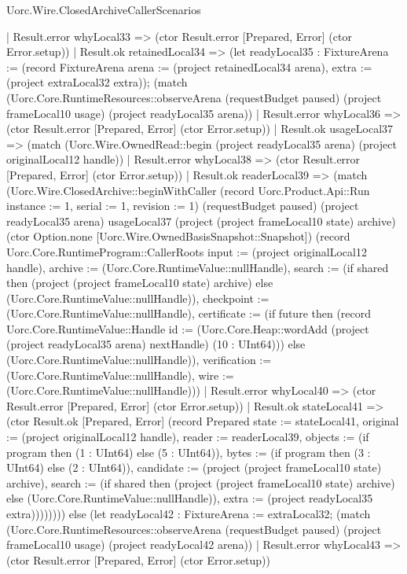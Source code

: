 \begin{lexlean}{Uorc.Wire.ClosedArchiveCallerScenarios}
\begin{semanticmodule}
{          | Result.error whyLocal33 => (ctor Result.error [Prepared, Error] (ctor Error.setup))
          | Result.ok retainedLocal34 => (let readyLocal35 : FixtureArena := (record FixtureArena {arena := (project retainedLocal34 arena), extra := (project extraLocal32 extra)}); (match (Uorc.Core.RuntimeResources::observeArena (requestBudget paused) (project frameLocal10 usage) (project readyLocal35 arena))
            | Result.error whyLocal36 => (ctor Result.error [Prepared, Error] (ctor Error.setup))
            | Result.ok usageLocal37 => (match (Uorc.Wire.OwnedRead::begin (project readyLocal35 arena) (project originalLocal12 handle))
              | Result.error whyLocal38 => (ctor Result.error [Prepared, Error] (ctor Error.setup))
              | Result.ok readerLocal39 => (match (Uorc.Wire.ClosedArchive::beginWithCaller (record Uorc.Product.Api::Run {instance := 1, serial := 1, revision := 1}) (requestBudget paused) (project readyLocal35 arena) usageLocal37 (project (project frameLocal10 state) archive) (ctor Option.none [Uorc.Wire.OwnedBasisSnapshot::Snapshot]) (record Uorc.Core.RuntimeProgram::CallerRoots {input := (project originalLocal12 handle), archive := (Uorc.Core.RuntimeValue::nullHandle), search := (if shared then (project (project frameLocal10 state) archive) else (Uorc.Core.RuntimeValue::nullHandle)), checkpoint := (Uorc.Core.RuntimeValue::nullHandle), certificate := (if future then (record Uorc.Core.RuntimeValue::Handle {id := (Uorc.Core.Heap::wordAdd (project (project readyLocal35 arena) nextHandle) (10 : UInt64))}) else (Uorc.Core.RuntimeValue::nullHandle)), verification := (Uorc.Core.RuntimeValue::nullHandle), wire := (Uorc.Core.RuntimeValue::nullHandle)}))
                | Result.error whyLocal40 => (ctor Result.error [Prepared, Error] (ctor Error.setup))
                | Result.ok stateLocal41 => (ctor Result.ok [Prepared, Error] (record Prepared {state := stateLocal41, original := (project originalLocal12 handle), reader := readerLocal39, objects := (if program then (1 : UInt64) else (5 : UInt64)), bytes := (if program then (3 : UInt64) else (2 : UInt64)), candidate := (project (project frameLocal10 state) archive), search := (if shared then (project (project frameLocal10 state) archive) else (Uorc.Core.RuntimeValue::nullHandle)), extra := (project readyLocal35 extra)}))))))) else (let readyLocal42 : FixtureArena := extraLocal32; (match (Uorc.Core.RuntimeResources::observeArena (requestBudget paused) (project frameLocal10 usage) (project readyLocal42 arena))
          | Result.error whyLocal43 => (ctor Result.error [Prepared, Error] (ctor Error.setup))
}
\end{semanticmodule}
\end{lexlean}
